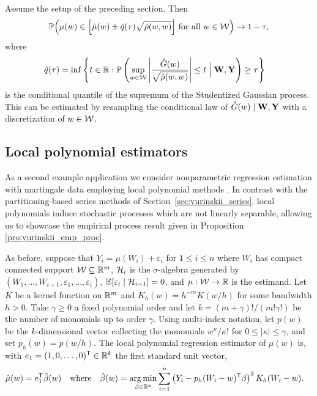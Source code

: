 \begin{proposition}%
  \label{pro:yurinskii_series_feasible}
  Assume the setup of the preceding section. Then
  \begin{align*}
    \mathbb{P}\Big(
      \mu(w) \in
      \Big[
        \hat\mu(w) \pm \hat q(\tau)
        \sqrt{\hat\rho(w,w)}
      \Big]
      \ \text{for all }
    w \in \mathcal{W} \Big)
    \to 1-\tau,
  \end{align*}
  where
  \begin{align*}
    \hat{q}(\tau)
    &=
    \inf
    \left\{
      t \in \mathbb{R}:
      \mathbb{P}\left(
        \sup_{w \in \mathcal{W}}
        \left|
        \frac{\hat G(w)}{\sqrt{\hat\rho(w,w)}}
        \right|
        \leq t
        \Bigm| \mathbf{W}, \mathbf{Y}
      \right)
      \geq \tau
    \right\}
  \end{align*}
  is the conditional quantile of the supremum of the Studentized Gaussian
  process. This can be estimated by resampling the conditional law of
  $\hat G(w) \mid \mathbf{W}, \mathbf{Y}$ with a discretization of $w \in \mathcal{W}$.
\end{proposition}

\subsection{Local polynomial estimators}
\label{sec:yurinskii_local_poly}

As a second example application we consider nonparametric regression estimation
with martingale data employing local polynomial methods
\citep{fan1996local}. In contrast with the partitioning-based series
methods of Section~\ref{sec:yurinskii_series}, local polynomials induce
stochastic
processes which are not linearly separable, allowing us to showcase the
empirical process result given in Proposition \ref{pro:yurinskii_emp_proc}.

As before, suppose that
$Y_i = \mu(W_i) + \varepsilon_i$
for $ 1 \leq i \leq n$
where $W_i$ has compact connected support $\mathcal{W} \subseteq \mathbb{R}^m$,
$\mathcal{H}_i$ is the $\sigma$-algebra generated by
$(W_1, \ldots, W_{i+1}, \varepsilon_1, \ldots, \varepsilon_i)$,
$\mathbb{E}[\varepsilon_i \mid \mathcal{H}_{i-1}] = 0$,
and $\mu: \mathcal{W} \to \mathbb{R}$ is the estimand. Let $K$ be a kernel function on $\mathbb{R}^m$
and $K_h(w) = h^{-m} K(w/h)$ for some bandwidth $h > 0$.
Take $\gamma \geq 0$ a fixed polynomial order and let
$k = (m+\gamma)!/(m!\gamma!)$ be the number of monomials up to order $\gamma$.
Using multi-index notation,
let $p(w)$ be the $k$-dimensional vector
collecting the monomials $w^{\kappa}/\kappa!$
for $0 \leq |\kappa| \leq \gamma$,
and set $p_h(w) = p(w/h)$.
The local polynomial regression estimator of $\mu(w)$ is,
with $e_1 = (1, 0, \ldots, 0)^{\mathsf{T}} \in \mathbb{R}^k$ the first standard unit vector,
%
\begin{align*}
  \hat{\mu}(w)
  &=
  e_1^{\mathsf{T}}\hat{\beta}(w)
  &\text{where} &
  &\hat{\beta}(w)
  &=
  \operatorname*{arg\,min}_{\beta \in \mathbb{R}^{k}}
  \sum_{i=1}^n
  \left(Y_i - p_h(W_i-w)^{\mathsf{T}} \beta \right)^2
  K_h(W_i-w).
\end{align*}

